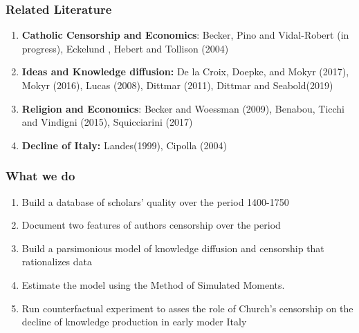 \documentclass[aspectratio=169,red,12pt]{beamer}
\begin{document}
	\begin{frame}
	\frametitle{Related Literature }
	
	\begin{enumerate}
		\item \textbf{Catholic Censorship and Economics}: Becker, Pino and Vidal-Robert (in progress), Eckelund , Hebert and Tollison (2004) \\ \vspace{0.3cm}
				
		\item \textbf{Ideas and Knowledge diffusion:} De la Croix,
		Doepke, and Mokyr (2017), Mokyr (2016), Lucas (2008), Dittmar (2011), Dittmar and Seabold(2019) \\ \vspace{0.3cm}  
		
		\item \textbf{Religion and Economics}: Becker and Woessman (2009), Benabou, Ticchi and Vindigni (2015), Squicciarini (2017) \\ \vspace{0.3cm}
		
		\item \textbf{Decline of Italy:} Landes(1999), Cipolla (2004)
		
		
	\end{enumerate}
	
\end{frame}

\begin{frame}
	\frametitle{What we do}
	\begin{enumerate}
		\item Build a database of scholars' quality over the period 1400-1750 \vspace{0.4cm}
		\item Document two features of authors censorship over the period \vspace{0.4cm}
		\item Build a parsimonious model of knowledge diffusion and censorship that rationalizes data
		\vspace{0.4cm}
		\item Estimate the model using the Method of Simulated Moments.\\	
		\vspace{0.4cm}
		\item Run counterfactual experiment to asses the role of Church's censorship on the decline of knowledge production in early moder Italy
	\end{enumerate}
	\vspace{0.6cm}
	
\end{frame}
\end{document}
